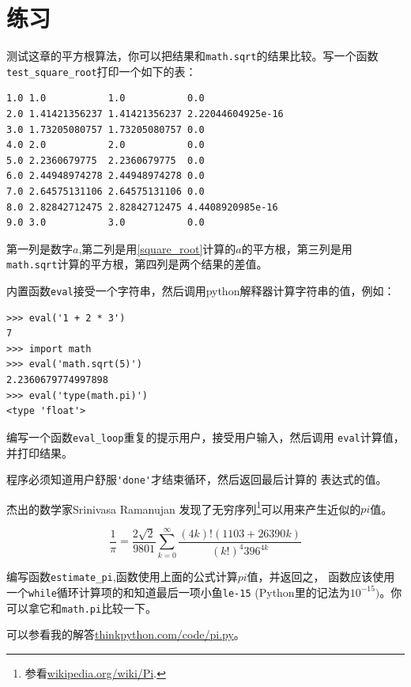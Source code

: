 \section{练习}

\begin{ex}


测试这章的平方根算法，你可以把结果和{\tt math.sqrt}的结果比较。写一个函数
\verb"test_square_root"打印一个如下的表：

\beforeverb
\begin{verbatim}
1.0 1.0           1.0           0.0
2.0 1.41421356237 1.41421356237 2.22044604925e-16
3.0 1.73205080757 1.73205080757 0.0
4.0 2.0           2.0           0.0
5.0 2.2360679775  2.2360679775  0.0
6.0 2.44948974278 2.44948974278 0.0
7.0 2.64575131106 2.64575131106 0.0
8.0 2.82842712475 2.82842712475 4.4408920985e-16
9.0 3.0           3.0           0.0

\end{verbatim}
\afterverb

第一列是数字$a$,第二列是用\ref{square_root}计算的$a$的平方根，第三列是用
{\tt math.sqrt}计算的平方根，第四列是两个结果的差值。
\end{ex}

\begin{ex}


内置函数{\tt eval}接受一个字符串，然后调用python解释器计算字符串的值，例如：

\beforeverb
\begin{verbatim}
>>> eval('1 + 2 * 3')
7
>>> import math
>>> eval('math.sqrt(5)')
2.2360679774997898
>>> eval('type(math.pi)')
<type 'float'>
\end{verbatim}
\afterverb

编写一个函数\verb"eval_loop"重复的提示用户，接受用户输入，然后调用
{\tt eval}计算值，并打印结果。

程序必须知道用户舒服\verb"'done'"才结束循环，然后返回最后计算的
表达式的值。
\end{ex}

\begin{ex}


杰出的数学家Srinivasa Ramanujan 发现了无穷序列\footnote{参看\url{wikipedia.org/wiki/Pi}.}可以用来产生近似的$pi$值。


\[\frac{1}{\pi} = \frac{2\sqrt{2}}{9801} 
\sum^\infty_{k=0} \frac{(4k)!(1103+26390k)}{(k!)^4 396^{4k}} \]

编写函数\verb"estimate_pi",函数使用上面的公式计算$pi$值，并返回之，
函数应该使用一个{\tt while}循环计算项的和知道最后一项小鱼{\tt le-15}
(Python里的记法为$10^{-15})$。你可以拿它和{\tt math.pi}比较一下。

可以参看我的解答\url{thinkpython.com/code/pi.py}。
\end{ex}






